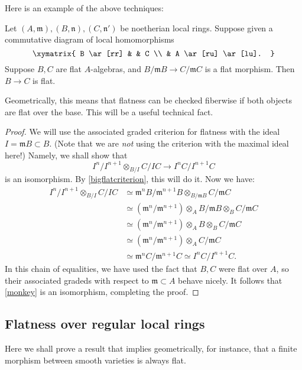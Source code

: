 Here is an example of the above techniques:
\begin{proposition} 
\label{fiberwiseflat}
Let $(A, \mathfrak{m}), (B, \mathfrak{n}), (C, \mathfrak{n}')$ be noetherian
local rings. Suppose given a commutative diagram of local homomorphisms
\[ \xymatrix{
B \ar[rr]  & & C \\
& A \ar[ru] \ar[lu].
}\]
Suppose $B, C$ are flat $A$-algebras, and $B/\mathfrak{m}B \to C/\mathfrak{m}C$
is a flat morphism. Then $B \to C$ is flat.
\end{proposition} 
Geometrically, this means that flatness can be checked fiberwise if both
objects are flat over the base.
This will be  a useful technical fact.
\begin{proof} 
We will use the associated graded criterion for flatness with the ideal
$I = \mathfrak{m}B \subset B$. (Note that we are \emph{not} using the criterion
with the maximal ideal here!) Namely, we shall show
that
\begin{equation} \label{monkey}  I^n/I^{n+1} \otimes_{B/I} C/IC \to I^n
C/I^{n+1}C \end{equation}
is an isomorphism. By \cref{bigflatcriterion}, this will do it. Now we have: 
\begin{align*}  
 I^n/I^{n+1} \otimes_{B/I} C/IC & \simeq 
\mathfrak{m}^nB/\mathfrak{m}^{n+1}B \otimes_{B/\mathfrak{m}B}
C/\mathfrak{m}C  \\ & \simeq
(\mathfrak{m}^n/\mathfrak{m}^{n+1})\otimes_{A} B/\mathfrak{m}B \otimes_B
C/\mathfrak{m}C  \\
& \simeq (\mathfrak{m}^n/\mathfrak{m}^{n+1})\otimes_{A} B \otimes_B
C/\mathfrak{m}C \\
& \simeq (\mathfrak{m}^n/\mathfrak{m}^{n+1})\otimes_{A} C/\mathfrak{m}C \\
& \simeq \mathfrak{m}^nC/\mathfrak{m}^{n+1} C \simeq I^n C/I^{n+1}C.
\end{align*}
In this chain of equalities, we have used the fact that $B, C$ were flat over
$A$, so their associated gradeds with respect to $\mathfrak{m} \subset A$
behave nicely. It follows that \eqref{monkey} is an isomorphism, completing the
proof.
\end{proof} 

\subsection{Flatness over regular local rings}

Here we shall prove a result that implies geometrically, for instance, that a
finite morphism between smooth varieties is always flat.

